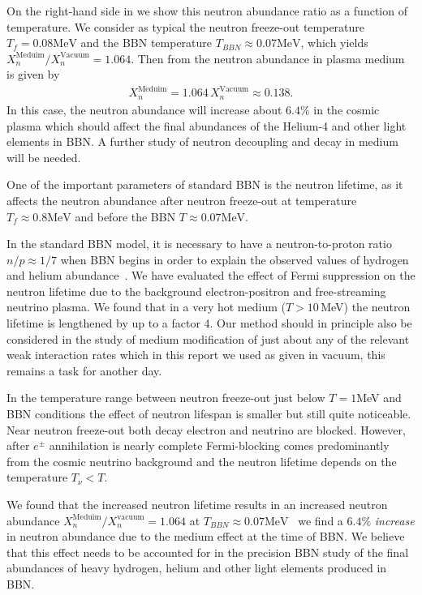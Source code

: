 On the right-hand side in   we show this neutron abundance ratio as a function of temperature. We consider as typical the neutron freeze-out temperature $T_f=0.08\mathrm{MeV}$ and the BBN  temperature $T_{BBN}\approx0.07\mathrm{MeV}$, which yields ${X_n^{\mathrm{Meduim}}}/{X_n^{\mathrm{Vacuum}}}=1.064$. Then from  the neutron abundance in plasma medium is given by
\begin{align}
X_n^{\mathrm{Meduim}}=1.064\,X_n^{\mathrm{Vacuum}}\approx0.138.
\end{align}
In this case, the neutron abundance will increase about $6.4\%$ in the cosmic plasma which should affect the final abundances of the Helium-4 and other light elements in BBN. A further study of neutron decoupling and decay in medium will be needed. 
 
One of the important parameters of standard BBN is the neutron lifetime, as it affects the neutron abundance after neutron freeze-out at temperature $T_f\approx 0.8 \mathrm{MeV}$ and before the BBN $T\approx0.07 \mathrm{MeV}$. 

In the standard BBN model, it is necessary to have a neutron-to-proton ratio $n/p\approx1/7$ when BBN begins in order to explain the observed values of hydrogen and helium abundance~\cite{Pitrou:2018cgg}. We have evaluated the effect of Fermi suppression on the neutron lifetime due to the background electron-positron  and free-streaming neutrino plasma. We found that in a very hot medium ($T>10$\,MeV) the neutron lifetime is lengthened by up to a factor 4. Our method should in principle also be considered in the study of medium modification of just about any of the relevant weak interaction rates which in this report we used as given in vacuum,  this remains a task for another day.

In the temperature range between neutron freeze-out just below $T=1$\;MeV and BBN conditions the effect of neutron lifespan is smaller but still quite noticeable. Near neutron freeze-out both decay electron and neutrino are blocked. However, after $e^\pm$ annihilation is nearly complete  Fermi-blocking comes predominantly from the cosmic neutrino background and the neutron lifetime depends on the temperature $T_\nu<T$.

We found that the increased neutron lifetime results in an increased neutron abundance ${X_n^{\mathrm{Meduim}}}/{X_n^{\mathrm{vacuum}}}=1.064$ at $T_{BBN}\approx0.07 \mathrm{MeV}$ \ie\ we find a $6.4\%$ \emph{increase} in neutron abundance due to the medium effect at the time of BBN. We believe that this effect needs to be accounted for in the precision BBN study of the final abundances of heavy hydrogen, helium and other light elements produced in BBN.

